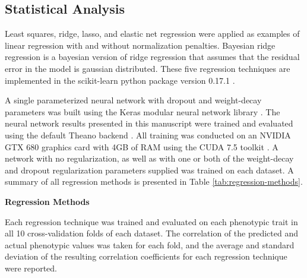 \documentclass[9pt,twocolumn,twoside]{g3_article/gsag3jnl}
\begin{document}
\subsection*{Statistical Analysis} 

Least squares, ridge, lasso, and elastic net regression were applied as examples of
linear regression with and without normalization penalties. Bayesian 
ridge regression is a bayesian version of ridge regression that assumes that 
the residual error in the model is gaussian distributed. These five regression 
techniques are implemented in the scikit-learn python package version 0.17.1 \citep{scikit-learn}.

A single parameterized neural network with dropout and weight-decay parameters was built using 
the Keras modular neural network library \citep{chollet2015}. The neural network results presented in this
manuscript were trained and evaluated using the default Theano backend \citep{team2016}. 
All training was conducted on an NVIDIA GTX 680 graphics card with 4GB 
of RAM using the CUDA 7.5 toolkit \citep{nickolls2008}. A network with no regularization,
as well as with one or both of the weight-decay and dropout regularization parameters
supplied was trained on each dataset. A summary of all regression methods is presented in Table \ref{tab:regression-methods}.

\begin{table*}[htbp]
\renewcommand{\familydefault}{\sfdefault}\normalfont
\centering
\caption{\bf Regression Methods}
\begin{tableminipage}{\textwidth}

\label{tab:regression-methods}
\footnotesize  
\end{tableminipage}
\end{table*}

Each regression technique was trained and evaluated on each phenotypic trait in all 10 cross-validation folds of each dataset.
The correlation of the predicted and actual phenotypic values was taken for each fold, and the average and 
standard deviation of the resulting correlation coefficients for each regression technique were reported.
 
\end{document}
